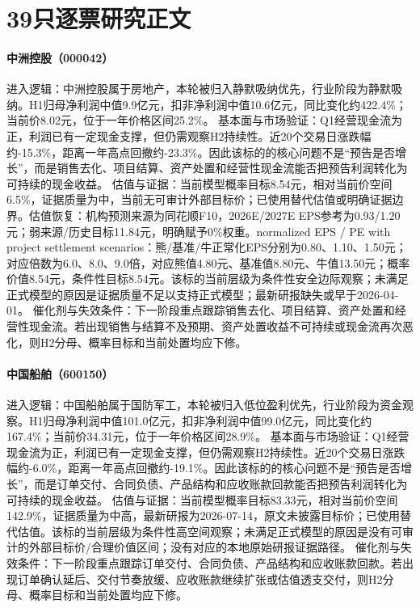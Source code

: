 \section{39只逐票研究正文}

\paragraph{中洲控股（000042）}
进入逻辑：中洲控股属于房地产，本轮被归入静默吸纳优先，行业阶段为静默吸纳。H1归母净利润中值9.9亿元，扣非净利润中值10.6亿元，同比变化约422.4\%；当前价8.02元，位于一年价格区间25.2\%。
基本面与市场验证：Q1经营现金流为正，利润已有一定现金支撑，但仍需观察H2持续性。近20个交易日涨跌幅约-15.3\%，距离一年高点回撤约-23.3\%。因此该标的的核心问题不是“预告是否增长”，而是销售去化、项目结算、资产处置和经营性现金流能否把预告利润转化为可持续的现金收益。
估值与证据：当前模型概率目标8.54元，相对当前价空间6.5\%，证据质量为中，当前无可审计外部目标价；已使用替代估值或明确证据边界。估值恢复：机构预测来源为同花顺F10，2026E/2027E EPS参考为0.93/1.20元；弱来源/历史目标11.84元，明确赋予0\%权重。normalized EPS / PE with project settlement scenarios：熊/基准/牛正常化EPS分别为0.80、1.10、1.50元；对应倍数为6.0、8.0、9.0倍，对应熊值4.80元、基准值8.80元、牛值13.50元；概率价值8.54元，条件性目标8.54元。该标的当前层级为条件性安全边际观察；未满足正式模型的原因是证据质量不足以支持正式模型；最新研报缺失或早于2026-04-01。
催化剂与失效条件：下一阶段重点跟踪销售去化、项目结算、资产处置和经营性现金流。若出现销售与结算不及预期、资产处置收益不可持续或现金流再次恶化，则H2分母、概率目标和当前处置均应下修。

\paragraph{中国船舶（600150）}
进入逻辑：中国船舶属于国防军工，本轮被归入低位盈利优先，行业阶段为资金观察。H1归母净利润中值101.0亿元，扣非净利润中值99.0亿元，同比变化约167.4\%；当前价34.31元，位于一年价格区间28.9\%。
基本面与市场验证：Q1经营现金流为正，利润已有一定现金支撑，但仍需观察H2持续性。近20个交易日涨跌幅约-6.0\%，距离一年高点回撤约-19.1\%。因此该标的的核心问题不是“预告是否增长”，而是订单交付、合同负债、产品结构和应收账款回款能否把预告利润转化为可持续的现金收益。
估值与证据：当前模型概率目标83.33元，相对当前价空间142.9\%，证据质量为中高，最新研报为2026-07-14，原文未披露目标价；已使用替代估值。该标的当前层级为条件性高空间观察；未满足正式模型的原因是没有可审计的外部目标价/合理价值区间；没有对应的本地原始研报证据路径。
催化剂与失效条件：下一阶段重点跟踪订单交付、合同负债、产品结构和应收账款回款。若出现订单确认延后、交付节奏放缓、应收账款继续扩张或估值透支交付，则H2分母、概率目标和当前处置均应下修。

